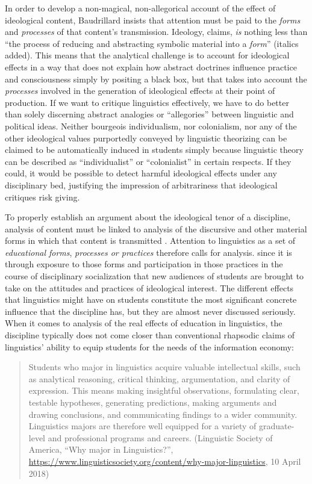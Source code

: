 \documentclass[output=paper]{langscibook}
\begin{document}
In order to develop a non-magical, non-allegorical account of the effect of ideological content, Baudrillard insists that attention must be paid to the \emph{forms} and \emph{processes} of that content's transmission. Ideology, \citet[77]{Baudrillard19881972} claims, \emph{is} nothing less than ``the process of reducing and abstracting symbolic material into a \emph{form}'' (italics added). This means that the analytical challenge is to account for ideological effects in a way that does not explain how abstract doctrines influence practice and consciousness simply by positing a black box, but that takes into account the \emph{processes} involved in the generation of ideological effects at their point of production. If we want to critique linguistics effectively, we have to do better than solely discerning abstract analogies or ``allegories'' between linguistic and political ideas. Neither bourgeois individualism, nor colonialism, nor any of the other ideological values purportedly conveyed by linguistic theorizing can be claimed to be automatically induced in students simply because linguistic theory can be described as ``individualist'' or ``colonialist'' in certain respects. If they could, it would be possible to detect harmful ideological effects under any disciplinary bed, justifying the impression of arbitrariness that ideological critiques risk giving.

To properly establish an argument about the ideological tenor of a discipline, analysis of content must be linked to analysis of the discursive and other material forms in which that content is transmitted \citep[cf.][]{Debry19961994}. Attention to linguistics as a set of \emph{educational forms}, \emph{processes or practices} therefore calls for analysis. since it is through exposure to those forms and participation in those practices in the course of disciplinary socialization that new audiences of students are brought to take on the attitudes and practices of ideological interest. The different effects that linguistics might have on students constitute the most significant concrete influence that the discipline has, but they are almost never discussed seriously. When it comes to analysis of the real effects of education in linguistics, the discipline typically does not come closer than conventional rhapsodic claims of linguistics' ability to equip students for the needs of the information economy:

\begin{quotation}
Students who major in linguistics acquire valuable intellectual skills, such as analytical reasoning, critical thinking, argumentation, and clarity of expression. This means making insightful observations, formulating clear, testable hypotheses, generating predictions, making arguments and drawing conclusions, and communicating findings to a wider community. Linguistics majors are therefore well equipped for a variety of graduate-level and professional programs and careers. (Linguistic Society of America, ``Why major in Linguistics?'', \url{https://www.linguisticsociety.org/content/why-major-linguistics}, 10 April 2018)
\end{quotation}
\end{document}
